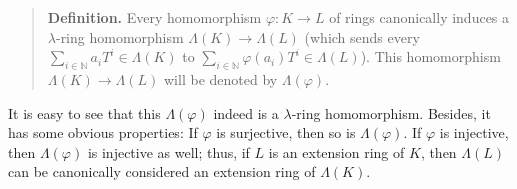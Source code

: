 \documentclass[12pt,final,notitlepage,onecolumn,german]{article}%
\begin{document}
\begin{quote}
\textbf{Definition.} Every homomorphism $\varphi:K\rightarrow L$ of rings
canonically induces a $\lambda$-ring homomorphism $\Lambda\left(  K\right)
\rightarrow\Lambda\left(  L\right)  $ (which sends every $\sum\limits_{i\in
\mathbb{N}}a_{i}T^{i}\in\Lambda\left(  K\right)  $ to $\sum\limits_{i\in
\mathbb{N}}\varphi\left(  a_{i}\right)  T^{i}\in\Lambda\left(  L\right)  $).
This homomorphism $\Lambda\left(  K\right)  \rightarrow\Lambda\left(
L\right)  $ will be denoted by $\Lambda\left(  \varphi\right)  $.
\end{quote}

It is easy to see that this $\Lambda\left(  \varphi\right)  $ indeed is a
$\lambda$-ring homomorphism. Besides, it has some obvious properties: If
$\varphi$ is surjective, then so is $\Lambda\left(  \varphi\right)  $. If
$\varphi$ is injective, then $\Lambda\left(  \varphi\right)  $ is injective as
well; thus, if $L$ is an extension ring of $K$, then $\Lambda\left(  L\right)
$ can be canonically considered an extension ring of $\Lambda\left(  K\right)
$.
\end{document}
